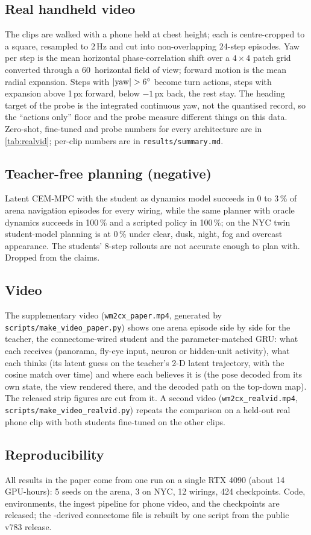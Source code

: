 \subsection{Real handheld video}
\label{sec:suppl-realvid}
The clips are walked with a phone held at chest height; each is centre-cropped to a square, resampled to 2\,Hz and cut
into non-overlapping 24-step episodes. Yaw per step is the mean horizontal phase-correlation shift over a $4\times4$
patch grid converted through a 60\degree\ horizontal field of view; forward motion is the mean radial expansion. Steps
with $|{\rm yaw}| > 6^\circ$ become turn actions, steps with expansion above 1\,px forward, below $-1$\,px back, the
rest stay. The heading target of the probe is the integrated continuous yaw, not the quantised record, so the
``actions only'' floor and the probe measure different things on this data. Zero-shot, fine-tuned and probe numbers for
every architecture are in \cref{tab:realvid}; per-clip numbers are in \texttt{results/summary.md}.

\subsection{Teacher-free planning (negative)}
\label{sec:suppl-plan}
Latent CEM-MPC with the student as dynamics model succeeds in 0 to 3\,\% of arena navigation episodes for every
wiring, while the same planner with oracle dynamics succeeds in 100\,\% and a scripted policy in 100\,\%; on the NYC
twin student-model planning is at 0\,\% under clear, dusk, night, fog and overcast appearance. The students' 8-step
rollouts are not accurate enough to plan with. Dropped from the claims.

\subsection{Video}
The supplementary video (\texttt{wm2cx\_paper.mp4}, generated by \texttt{scripts/make\_video\_paper.py}) shows one
arena episode side by side for the \vjepa teacher, the connectome-wired student and the parameter-matched GRU: what each
receives (panorama, fly-eye input, neuron or hidden-unit activity), what each thinks (its latent guess on the teacher's
2-D latent trajectory, with the cosine match over time) and where each believes it is (the pose decoded from its own
state, the view rendered there, and the decoded path on the top-down map). The released strip figures are cut from it. A second
video (\texttt{wm2cx\_realvid.mp4}, \texttt{scripts/make\_video\_realvid.py}) repeats the comparison on a held-out real
phone clip with both students fine-tuned on the other clips.

\subsection{Reproducibility}
All results in the paper come from one run on a single RTX 4090 (about 14 GPU-hours): 5 seeds on the arena, 3 on NYC,
12 wirings, 424 checkpoints. Code, environments, the ingest pipeline for phone video, and the checkpoints are released;
the \flywire-derived connectome file is rebuilt by one script from the public v783 release.
